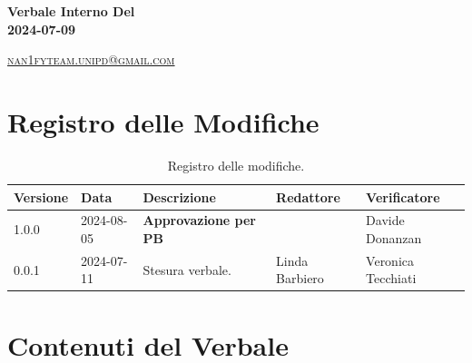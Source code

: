 \documentclass[8pt]{article}
\begin{document}
\begin{titlepage}
\begin{minipage}[t]{0.47\textwidth}
{		}
		\vspace{4mm}\vspace{4mm}
	\end{minipage}
	\vspace{4cm}
	\begin{center}
		\begin{flushright}
			{\fontsize{30pt}{52pt}\selectfont \textbf{Verbale Interno Del\\2024-07-09\\}} %
		\end{flushright}
		\vspace{3cm}
	\end{center}
	\vspace{8.5 cm}
	{\small \textsc{\href{mailto: nan1fyteam.unipd@gmail.com}{nan1fyteam.unipd@gmail.com}}}
\end{titlepage}
\pagestyle{mystyle}
\section*{Registro delle Modifiche}
\begin{table}[ht!]	
	\centering
	\begin{tabular}{p{1.2cm} p{2cm} p{5cm} p{3cm} p{3cm}}
		\toprule
		\textbf{Versione}& \textbf{Data} & \textbf{Descrizione} & \textbf{Redattore} & \textbf{Verificatore} \\
		\midrule
			1.0.0 & 2024-08-05 & \textbf{Approvazione per PB} & & Davide Donanzan \\
			0.0.1 & 2024-07-11 & Stesura verbale. & Linda Barbiero & Veronica Tecchiati
 			\\ %

		\bottomrule
	\end{tabular}
	\caption{Registro delle modifiche.}
	\label{table:Registro delle modifiche}
\end{table}
\newpage
\tableofcontents
\clearpage
\newpage
\justifying
\section{Contenuti del Verbale}
\end{document}
